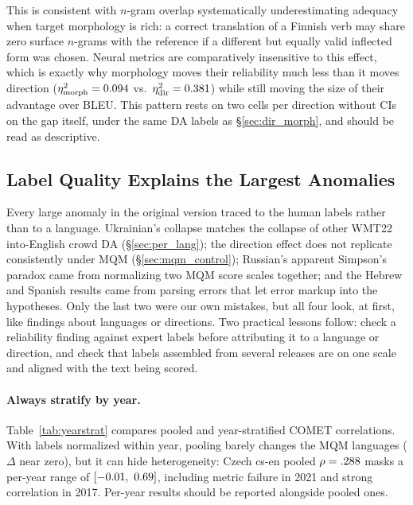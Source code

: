 \documentclass[11pt]{article}
\begin{document}
This is consistent with $n$-gram overlap systematically underestimating adequacy when target morphology is rich: a correct translation of a Finnish verb may share zero surface $n$-grams with the reference if a different but equally valid inflected form was chosen. Neural metrics are comparatively insensitive to this effect, which is exactly why morphology moves their reliability much less than it moves direction ($\eta^2_{\text{morph}}=0.094$ vs.\ $\eta^2_{\text{dir}}=0.381$) while still moving the size of their advantage over BLEU. This pattern rests on two cells per direction without CIs on the gap itself, under the same DA labels as \S\ref{sec:dir_morph}, and should be read as descriptive.

\subsection{Label Quality Explains the Largest Anomalies}
\label{sec:label_quality}

Every large anomaly in the original version traced to the human labels rather than to a language. Ukrainian's collapse matches the collapse of other WMT22 into-English crowd DA (\S\ref{sec:per_lang}); the direction effect does not replicate consistently under MQM (\S\ref{sec:mqm_control}); Russian's apparent Simpson's paradox came from normalizing two MQM score scales together; and the Hebrew and Spanish results came from parsing errors that let error markup into the hypotheses. Only the last two were our own mistakes, but all four look, at first, like findings about languages or directions. Two practical lessons follow: check a reliability finding against expert labels before attributing it to a language or direction, and check that labels assembled from several releases are on one scale and aligned with the text being scored.

\paragraph{Always stratify by year.}
Table~\ref{tab:yearstrat} compares pooled and year-stratified COMET correlations. With labels normalized within year, pooling barely changes the MQM languages ($\Delta$ near zero), but it can hide heterogeneity: Czech cs-en pooled $\rho=.288$ masks a per-year range of $[-0.01,\ 0.69]$, including metric failure in 2021 and strong correlation in 2017. Per-year results should be reported alongside pooled ones.
\end{document}
